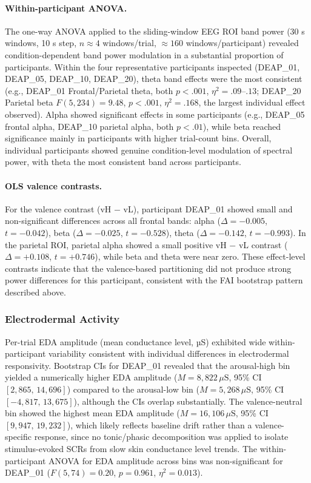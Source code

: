\paragraph{Within-participant \gls{ANOVA}.}
The one-way \gls{ANOVA} applied to the sliding-window EEG \gls{ROI} band power (30 s windows, 10 s step, $n \approx 4$ windows/trial, $\approx 160$ windows/participant) revealed condition-dependent band power modulation in a substantial proportion of participants. Within the four representative participants inspected (DEAP\_01, DEAP\_05, DEAP\_10, DEAP\_20), theta band effects were the most consistent (e.g., DEAP\_01 Frontal/Parietal theta, both $p < .001$, $\eta^2 = .09$--$.13$; DEAP\_20 Parietal beta $F(5, 234) = 9.48$, $p < .001$, $\eta^2 = .168$, the largest individual effect observed). Alpha showed significant effects in some participants (e.g., DEAP\_05 frontal alpha, DEAP\_10 parietal alpha, both $p < .01$), while beta reached significance mainly in participants with higher trial-count bins. Overall, individual participants showed genuine condition-level modulation of spectral power, with theta the most consistent band across participants.

\paragraph{OLS valence contrasts.}
For the valence contrast (vH $-$ vL), participant DEAP\_01 showed small and non-significant differences across all frontal bands: alpha ($\Delta = -0.005$, $t = -0.042$), beta ($\Delta = -0.025$, $t = -0.528$), theta ($\Delta = -0.142$, $t = -0.993$). In the parietal \gls{ROI}, parietal alpha showed a small positive vH $-$ vL contrast ($\Delta = +0.108$, $t = +0.746$), while beta and theta were near zero. These effect-level contrasts indicate that the valence-based partitioning did not produce strong power differences for this participant, consistent with the \gls{FAI} bootstrap pattern described above.

\subsubsection{Electrodermal Activity}

Per-trial \gls{EDA} amplitude (mean conductance level, µS) exhibited wide within-participant variability consistent with individual differences in electrodermal responsivity. Bootstrap CIs for DEAP\_01 revealed that the arousal-high bin yielded a numerically higher EDA amplitude ($M = 8{,}822\,\mu\text{S}$, 95\% CI $[2{,}865,\, 14{,}696]$) compared to the arousal-low bin ($M = 5{,}268\,\mu\text{S}$, 95\% CI $[-4{,}817,\, 13{,}675]$), although the CIs overlap substantially. The valence-neutral bin showed the highest mean EDA amplitude ($M = 16{,}106\,\mu\text{S}$, 95\% CI $[9{,}947,\, 19{,}232]$), which likely reflects baseline drift rather than a valence-specific response, since no tonic/phasic decomposition was applied to isolate stimulus-evoked \glspl{SCR} from slow skin conductance level trends. The within-participant \gls{ANOVA} for EDA amplitude across bins was non-significant for DEAP\_01 ($F(5, 74) = 0.20$, $p = 0.961$, $\eta^2 = 0.013$).



